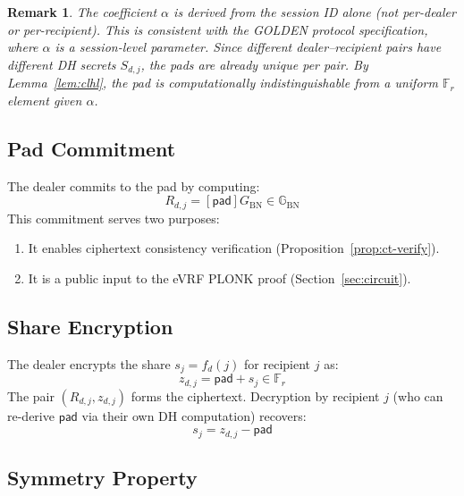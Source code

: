 \documentclass[11pt,a4paper]{article}
\newtheorem{remark}{Remark}[section]
\newcommand{\F}{\mathbb{F}}
\newcommand{\G}{\mathbb{G}}
\newcommand{\Gbn}{\G_{\mathrm{BN}}}
\newcommand{\Fr}{\F_r}
\newcommand{\genbn}{G_{\mathrm{BN}}}
\newcommand{\pad}{\mathsf{pad}}
\begin{document}
\begin{remark}
  The coefficient $\alpha$ is derived from the session ID alone (not
  per-dealer or per-recipient). This is consistent with the GOLDEN protocol
  specification, where $\alpha$ is a session-level parameter. Since different
  dealer--recipient pairs have different DH secrets $S_{d,j}$, the pads are
  already unique per pair. By Lemma~\ref{lem:clhl}, the pad is computationally
  indistinguishable from a uniform $\Fr$ element given $\alpha$.
\end{remark}

\subsection{Pad Commitment}
\label{sec:padcommit}

The dealer commits to the pad by computing:
\begin{equation}
  R_{d,j} = [\pad]\genbn \in \Gbn
  \label{eq:rcommitment}
\end{equation}
This commitment serves two purposes:
\begin{enumerate}[nosep]
  \item It enables ciphertext consistency verification (Proposition~\ref{prop:ct-verify}).
  \item It is a public input to the eVRF PLONK proof (Section~\ref{sec:circuit}).
\end{enumerate}

\subsection{Share Encryption}
\label{sec:encrypt}

The dealer encrypts the share $s_j = f_d(j)$ for recipient $j$ as:
\begin{equation}
  z_{d,j} = \pad + s_j \in \Fr
  \label{eq:ciphertext}
\end{equation}
The pair $(R_{d,j}, z_{d,j})$ forms the ciphertext. Decryption by recipient
$j$ (who can re-derive $\pad$ via their own DH computation) recovers:
\begin{equation}
  s_j = z_{d,j} - \pad
  \label{eq:decrypt}
\end{equation}

\subsection{Symmetry Property}
\label{sec:symmetry}
\end{document}
